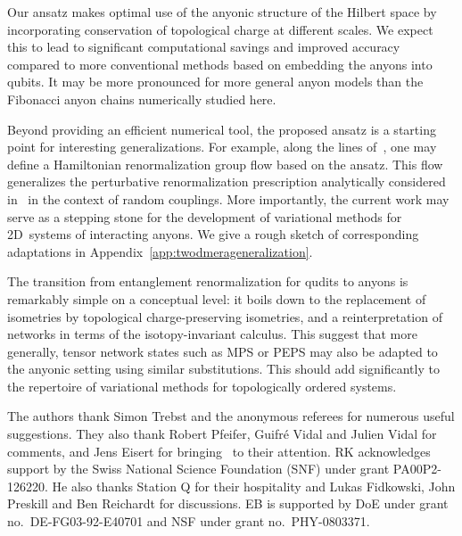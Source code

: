 \documentclass[floats,prb,twocolumn]{revtex4}
\begin{document}
Our ansatz  makes optimal use of the anyonic structure of the Hilbert space by incorporating conservation of topological charge at different scales. We expect this to lead to  significant computational savings and improved accuracy compared to more conventional methods based on embedding the anyons into qubits.  It may be more pronounced for more general anyon models than the Fibonacci anyon chains numerically studied here. 



Beyond providing an  efficient numerical tool, the proposed ansatz is  a starting point for interesting generalizations. For example, along the lines of~\cite{evenblyvidal09}, one may define a Hamiltonian renormalization group flow based on the ansatz. This  flow generalizes the perturbative renormalization prescription analytically considered in~\cite{BonesteelYang07,Fidkowskietalrandom,Fidkowskietal08b} in the context of random couplings.  More importantly, the current work may serve as a stepping stone for the development of variational methods for 2D~systems of interacting anyons. We give a rough sketch of corresponding adaptations in Appendix~\ref{app:twodmerageneralization}.

The transition from entanglement renormalization for qudits  to anyons is remarkably simple on a conceptual level: it boils down to the replacement of isometries by topological charge-preserving isometries, and a reinterpretation of networks in terms of the isotopy-invariant calculus. This suggest that more generally, tensor network states such as MPS or PEPS may also be adapted to the anyonic setting using similar substitutions. This should add significantly to the repertoire of variational methods for topologically ordered systems.




\vspace{2ex}
\begin{acknowledgments}
The authors thank Simon Trebst and the anonymous referees for numerous useful suggestions. They also thank Robert Pfeifer, Guifr\'e Vidal and Julien Vidal for comments, and Jens Eisert for bringing~\cite{Bartheletal09,Pinedaetal10} to their attention. RK acknowledges support by the Swiss National Science Foundation (SNF) under grant PA00P2-126220. He also thanks Station Q for their hospitality and Lukas Fidkowski, John Preskill and Ben Reichardt for discussions.  EB is supported by DoE under grant no.~DE-FG03-92-E40701 and NSF under grant no.~PHY-0803371.
\end{acknowledgments} 
\end{document}
